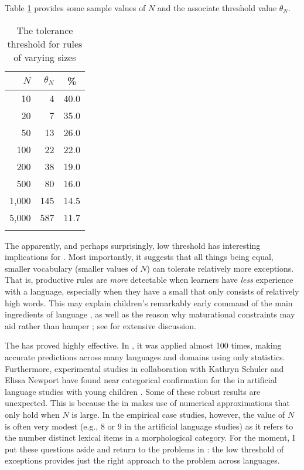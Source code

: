 \documentclass[output=paper,
modfonts
]{LSP/langsci}
\begin{document}
Table \ref{t:tolerance} provides some sample values of $N$ and the
associate threshold value $\theta_N$.  

\begin{table}[h!]
\begin{center}
\caption{The tolerance threshold for rules of varying sizes}
\label{t:tolerance} 
\begin{tabular}{rrc}
\lsptoprule
$N$    & $\theta_{N}$  & \%\\  
\midrule
    10 & 4     & 40.0\\
    20 & 7     & 35.0\\
    50 & 13    & 26.0\\
   100 & 22    & 22.0 \\
   200 & 38    & 19.0 \\
   500 & 80    & 16.0\\
 1,000 & 145   & 14.5\\
 5,000 & 587   & 11.7\\ 
 \lspbottomrule
\end{tabular}
\end{center}
\end{table}

The apparently, and perhaps  surprisingly, low threshold has
interesting implications for . Most 
importantly, it suggests that all things being equal,  smaller
vocabulary (smaller values of $N$) can tolerate relatively more
exceptions. That is, productive rules are \textit{more} detectable
when  learners have \textit{less} experience with a language, especially
when they have a small  that only consists of relatively high
 words.  This may  explain children's
remarkably early command of the main ingredients of language
\citep{Yang2013}, as well as the reason  why maturational constraints
may aid rather than hamper  \citep{Newport1990};
see \citealt[][Chapter 7]{POP} for extensive discussion. 

The  has
proved highly effective. In  \citet{POP}, it was applied almost 100
times, making accurate  predictions across many languages and
domains using only  statistics. Furthermore,
experimental studies in collaboration with Kathryn Schuler
and Elissa Newport have found near categorical confirmation for the
 in artificial language studies with young children
\citep{Schuler2016}. 
Some of these robust results are unexpected. 
This is because the  in   makes use of
numerical approximations that only hold when $N$ is large. In
the empirical case studies, however, the value of $N$ is often very
modest (e.g., 8 or 9 in the artificial language studies) as it refers to the number 
 distinct lexical items in a morphological category. 
For the moment, I put these questions aside and 
return to  the problems in : the low threshold of exceptions provides just the right approach to the
 problem across languages.  
\end{document}

